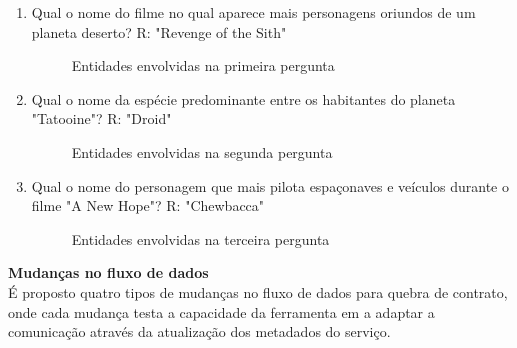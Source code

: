 \begin{enumerate}
\item Qual o nome do filme no qual aparece mais personagens oriundos de um planeta deserto? R: "Revenge of the Sith"

\begin{figure}[H]
  \centering
  \caption{Entidades envolvidas na primeira pergunta}
\end{figure}

\item Qual o nome da espécie predominante entre os habitantes do planeta "Tatooine"? R: "Droid"

\begin{figure}[H]
  \centering
  \caption{Entidades envolvidas na segunda pergunta}
\end{figure}

\item Qual o nome do personagem que mais pilota espaçonaves e veículos durante o filme "A New Hope"? R: "Chewbacca"

\begin{figure}[H]
  \centering
  \caption{Entidades envolvidas na terceira pergunta}
\end{figure}

\end{enumerate}

\textbf{Mudanças no fluxo de dados} \\

É proposto quatro tipos de mudanças no fluxo de dados para quebra de contrato, onde cada mudança testa a capacidade da ferramenta em a adaptar a comunicação através da atualização dos metadados do serviço.

